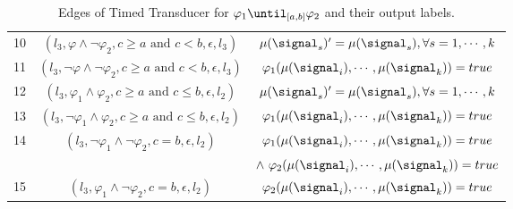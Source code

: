\begin{table}[H]
{\begin{tabular}{@{}ccc@{}}
        10 & $(l_3, \varphi \land \neg \varphi_2, c \geq a \text{ and } c<b , \epsilon, l_3)$ & $\mu(\signal_s)'=\mu(\signal_s), \forall s= 1, \cdots, k$  \\ 
        11 & $(l_3, \neg \varphi \land \neg \varphi_2, c \geq a \text{ and } c<b, \epsilon, l_3)$ & $\varphi_1(\mu(\signal_i), \cdots, \mu(\signal_k))=true$  \\ 
        
        12 & $(l_3, \varphi_1 \land \varphi_2, c \geq a \text{ and } c \leq b, \epsilon, l_2)$ & $\mu(\signal_s)'=\mu(\signal_s), \forall s= 1, \cdots, k$  \\
        13 & $(l_3, \neg \varphi_1 \land \varphi_2, c \geq a \text{ and } c \leq b, \epsilon, l_2)$ & $\varphi_1(\mu(\signal_i), \cdots, \mu(\signal_k))=true$  \\
        14 & $(l_3, \neg \varphi_1 \land \neg \varphi_2, c =b, \epsilon, l_2)$ & $\varphi_1(\mu(\signal_i), \cdots, \mu(\signal_k))=true $  \\
        & &$\land ~\varphi_2(\mu(\signal_i), \cdots, \mu(\signal_k))=true$\\
        15 & $(l_3, \varphi_1 \land \neg \varphi_2, c =b, \epsilon, l_2)$ & $\varphi_2(\mu(\signal_i), \cdots, \mu(\signal_k))=true$  \\
        
        \bottomrule
        \end{tabular}}
        \caption
        {Edges of Timed Transducer for $\varphi_1\until_{[a,b]}\varphi_2$ and their output labels.}
        \label{table:until}
        \end{table}





